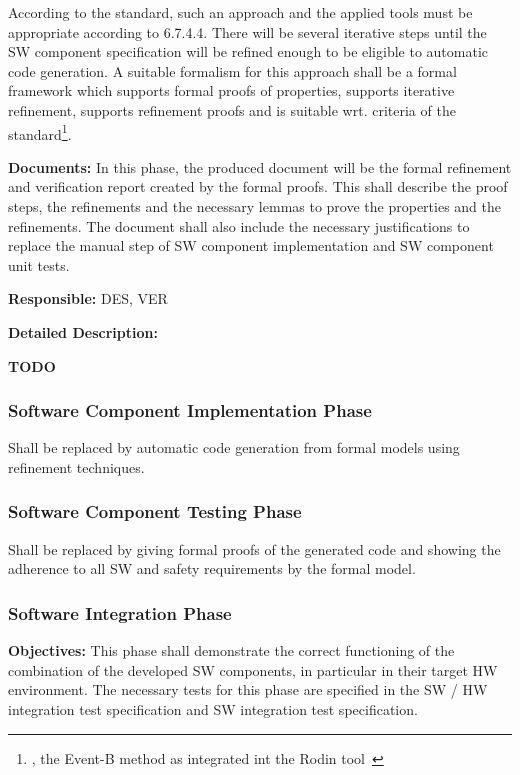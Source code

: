 According to the standard, such an approach and the applied tools must be
appropriate according to 6.7.4.4. There will be several iterative steps until
the SW component specification will be refined enough to be eligible to
automatic code generation. A suitable formalism for this approach shall be a
formal framework which supports formal proofs of properties, supports iterative
refinement, supports refinement proofs and is suitable wrt. criteria of the
standard\footnote{\eg, the Event-B method as integrated int the Rodin
  tool~\cite{Abrial:Rodin}}.

{\bf Documents:} In this phase, the produced document will be the formal
refinement and verification report created by the formal proofs. This shall
describe the proof steps, the refinements and the necessary lemmas to prove the
properties and the refinements. The document shall also include the necessary
justifications to replace the manual step of SW component implementation and SW
component unit tests.

{\bf Responsible:} DES, VER

{\bf Detailed Description:}

{\Huge \bf TODO}

\subsubsection{Software Component Implementation Phase}
\label{sec:softw-comp-impl}

Shall be replaced by automatic code generation from formal models using
refinement techniques.

\subsubsection{Software Component Testing Phase}
\label{sec:softw-comp-test}

Shall be replaced by giving formal proofs of the generated code and showing the
adherence to all SW and safety requirements by the formal model.

\subsubsection{Software Integration Phase}
\label{sec:softw-integr-phase}

{\bf Objectives:} This phase shall demonstrate the correct functioning of the
combination of the developed SW components, in particular in their target HW
environment. The necessary tests for this phase are specified in the SW / HW
integration test specification and SW integration test specification.

